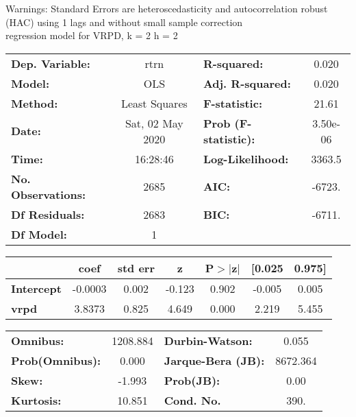 Warnings: \newline
 [1] Standard Errors are heteroscedasticity and autocorrelation robust (HAC) using 1 lags and without small sample correction\\ 

regression model for VRPD, k = 2 h = 2\begin{center}
\begin{tabular}{lclc}
\toprule
\textbf{Dep. Variable:}    &       rtrn       & \textbf{  R-squared:         } &     0.020   \\
\textbf{Model:}            &       OLS        & \textbf{  Adj. R-squared:    } &     0.020   \\
\textbf{Method:}           &  Least Squares   & \textbf{  F-statistic:       } &     21.61   \\
\textbf{Date:}             & Sat, 02 May 2020 & \textbf{  Prob (F-statistic):} &  3.50e-06   \\
\textbf{Time:}             &     16:28:46     & \textbf{  Log-Likelihood:    } &    3363.5   \\
\textbf{No. Observations:} &        2685      & \textbf{  AIC:               } &    -6723.   \\
\textbf{Df Residuals:}     &        2683      & \textbf{  BIC:               } &    -6711.   \\
\textbf{Df Model:}         &           1      & \textbf{                     } &             \\
\bottomrule
\end{tabular}
\begin{tabular}{lcccccc}
                   & \textbf{coef} & \textbf{std err} & \textbf{z} & \textbf{P$> |$z$|$} & \textbf{[0.025} & \textbf{0.975]}  \\
\midrule
\textbf{Intercept} &      -0.0003  &        0.002     &    -0.123  &         0.902        &       -0.005    &        0.005     \\
\textbf{vrpd}      &       3.8373  &        0.825     &     4.649  &         0.000        &        2.219    &        5.455     \\
\bottomrule
\end{tabular}
\begin{tabular}{lclc}
\textbf{Omnibus:}       & 1208.884 & \textbf{  Durbin-Watson:     } &    0.055  \\
\textbf{Prob(Omnibus):} &   0.000  & \textbf{  Jarque-Bera (JB):  } & 8672.364  \\
\textbf{Skew:}          &  -1.993  & \textbf{  Prob(JB):          } &     0.00  \\
\textbf{Kurtosis:}      &  10.851  & \textbf{  Cond. No.          } &     390.  \\
\bottomrule
\end{tabular}
\end{center}

